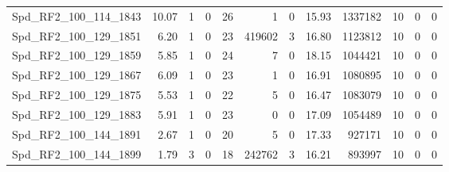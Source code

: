 \begin{longtable}[c]{@{}lrrrrrrrrrrr@{}}
Spd\_RF2\_100\_114\_1843      & 10.07                  & 1                       & 0                       & 26                     & 1                       & 0                       & 15.93                   & 1337182                  & 10                       & 0                        & 0                        \\
Spd\_RF2\_100\_129\_1851      & 6.20                   & 1                       & 0                       & 23                     & 419602                  & 3                       & 16.80                   & 1123812                  & 10                       & 0                        & 0                        \\
Spd\_RF2\_100\_129\_1859      & 5.85                   & 1                       & 0                       & 24                     & 7                       & 0                       & 18.15                   & 1044421                  & 10                       & 0                        & 0                        \\
Spd\_RF2\_100\_129\_1867      & 6.09                   & 1                       & 0                       & 23                     & 1                       & 0                       & 16.91                   & 1080895                  & 10                       & 0                        & 0                        \\
Spd\_RF2\_100\_129\_1875      & 5.53                   & 1                       & 0                       & 22                     & 5                       & 0                       & 16.47                   & 1083079                  & 10                       & 0                        & 0                        \\
Spd\_RF2\_100\_129\_1883      & 5.91                   & 1                       & 0                       & 23                     & 0                       & 0                       & 17.09                   & 1054489                  & 10                       & 0                        & 0                        \\
Spd\_RF2\_100\_144\_1891      & 2.67                   & 1                       & 0                       & 20                     & 5                       & 0                       & 17.33                   & 927171                   & 10                       & 0                        & 0                        \\
Spd\_RF2\_100\_144\_1899      & 1.79                   & 3                       & 0                       & 18                     & 242762                  & 3                       & 16.21                   & 893997                   & 10                       & 0                        & 0                        \\

\end{longtable}
